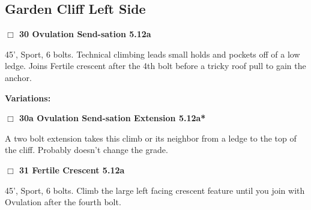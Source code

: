 	\begin{multicols}{2}

\needspace{10em}
\subsection*{Garden Cliff Left Side}\label{bf:Garden Cliff Left Side}




\needspace{2em}
\label{rt:Ovulation Send-sation}
\colorbox{Goldenrod!20}{
\parbox{0.95\linewidth}{
\hspace{-1ex}\textbf{$\Box$
30 Ovulation Send-sation 5.12a  
}}}
\begin{adjustwidth}{1.3em}{}			

45', Sport, 6 bolts. Technical climbing leads small holds and pockets off of a low ledge. Joins Fertile crescent after the 4th bolt before a tricky roof pull to gain the anchor.
\end{adjustwidth}


\begin{adjustwidth}{0.5cm}{}				
\needspace{4em}
\textbf{Variations:} \newline

\needspace{2em}
\label{vr:Ovulation Send-sation Extension}
\colorbox{Goldenrod!20}{
\parbox{0.95\linewidth}{
\hspace{-1ex}\textbf{$\Box$
30a Ovulation Send-sation Extension 5.12a*  
}}}
\begin{adjustwidth}{1.3em}{}			

A two bolt extension takes this climb or its neighbor from a ledge to the top of the cliff. Probably doesn't change the grade.
\end{adjustwidth}



\end{adjustwidth}


\needspace{2em}
\label{rt:Fertile Crescent}
\colorbox{Goldenrod!20}{
\parbox{0.95\linewidth}{
\hspace{-1ex}\textbf{$\Box$
31 Fertile Crescent 5.12a  
}}}
\begin{adjustwidth}{1.3em}{}			

45', Sport, 6 bolts. Climb the large left facing crescent feature until you join with Ovulation after the fourth bolt.
\end{adjustwidth}





\end{multicols}

